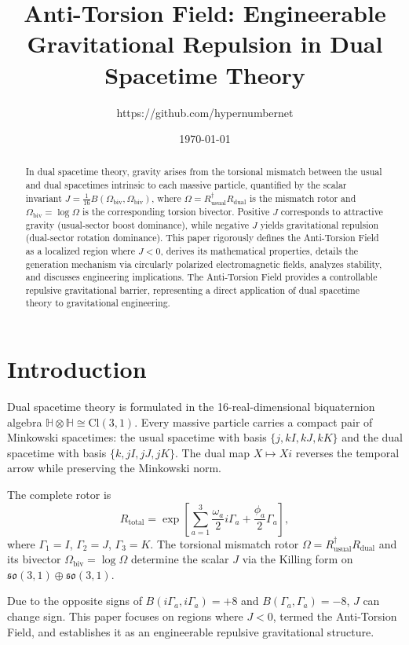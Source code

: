 \documentclass[dvipdfmx,11pt,a4paper]{article}
\title{Anti-Torsion Field: Engineerable Gravitational Repulsion in Dual Spacetime Theory}
\author{https://github.com/hypernumbernet}
\date{\today}
\theoremstyle{definition}
\begin{document}
\maketitle

\begin{abstract}
In dual spacetime theory, gravity arises from the torsional mismatch between the usual and dual spacetimes intrinsic to each massive particle, quantified by the scalar invariant $J = \frac{1}{16} B(\Omega_\text{biv}, \Omega_\text{biv})$, where $\Omega = R_\text{usual}^\dagger R_\text{dual}$ is the mismatch rotor and $\Omega_\text{biv} = \log \Omega$ is the corresponding torsion bivector. Positive $J$ corresponds to attractive gravity (usual-sector boost dominance), while negative $J$ yields gravitational repulsion (dual-sector rotation dominance). This paper rigorously defines the Anti-Torsion Field as a localized region where $J < 0$, derives its mathematical properties, details the generation mechanism via circularly polarized electromagnetic fields, analyzes stability, and discusses engineering implications. The Anti-Torsion Field provides a controllable repulsive gravitational barrier, representing a direct application of dual spacetime theory to gravitational engineering.
\end{abstract}

\section{Introduction}

Dual spacetime theory is formulated in the 16-real-dimensional biquaternion algebra $\mathbb{H} \otimes \mathbb{H} \cong \mathrm{Cl}(3,1)$. Every massive particle carries a compact pair of Minkowski spacetimes: the usual spacetime with basis $\{j, kI, kJ, kK\}$ and the dual spacetime with basis $\{k, jI, jJ, jK\}$. The dual map $X \mapsto Xi$ reverses the temporal arrow while preserving the Minkowski norm.

The complete rotor is
\[
R_\text{total} = \exp\left[ \sum_{a=1}^3 \frac{\omega_a}{2} i\Gamma_a + \frac{\phi_a}{2} \Gamma_a \right],
\]
where $\Gamma_1 = I$, $\Gamma_2 = J$, $\Gamma_3 = K$. The torsional mismatch rotor $\Omega = R_\text{usual}^\dagger R_\text{dual}$ and its bivector $\Omega_\text{biv} = \log \Omega$ determine the scalar $J$ via the Killing form on $\mathfrak{so}(3,1) \oplus \mathfrak{so}(3,1)$.

Due to the opposite signs of $B(i\Gamma_a, i\Gamma_a) = +8$ and $B(\Gamma_a, \Gamma_a) = -8$, $J$ can change sign. This paper focuses on regions where $J < 0$, termed the Anti-Torsion Field, and establishes it as an engineerable repulsive gravitational structure.
\end{document}
